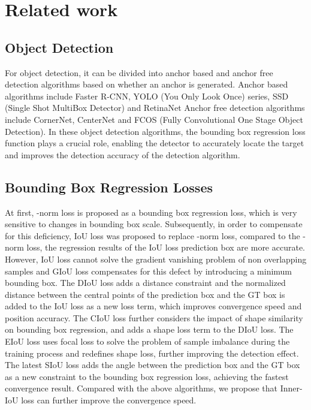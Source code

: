 \documentclass[lettersize,journal]{IEEEtran}
\begin{document}
	\section{Related work}
	\subsection{Object Detection}
	For object detection, it can be divided into anchor based and anchor free detection algorithms based on whether an anchor is generated. Anchor based algorithms include Faster R-CNN\cite{ref14}, YOLO (You Only Look Once) series\cite{ref10,ref11,ref12,ref13}, SSD (Single Shot MultiBox Detector)\cite{ref15} and RetinaNet\cite{ref16} Anchor free detection algorithms include CornerNet\cite{ref17}, CenterNet\cite{ref18} and FCOS (Fully Convolutional One Stage Object Detection)\cite{ref19}. In these object detection algorithms, the bounding box regression loss function plays a crucial role, enabling the detector to accurately locate the target and improves the detection accuracy of the detection algorithm.
	
	\subsection{Bounding Box Regression Losses}
	At first,  -norm loss\cite{ref14} is proposed as a bounding box regression loss, which is very sensitive to changes in bounding box scale. Subsequently, in order to compensate for this deficiency, IoU loss\cite{ref1} was proposed to replace -norm loss, compared to the -norm loss, the regression results of the IoU loss\cite{ref1} prediction box are more accurate. However, IoU loss cannot solve the gradient vanishing problem of non overlapping samples and GIoU loss\cite{ref2} compensates for this defect by introducing a minimum bounding box. The DIoU loss\cite{ref3} adds a distance constraint and the normalized distance between the central points of the prediction box and the GT box is added to the IoU loss as a new loss term, which improves convergence speed and position accuracy. The CIoU loss\cite{ref3} further considers the impact of shape similarity on bounding box regression, and adds a shape loss term to the DIoU loss. The EIoU loss\cite{ref4} uses focal loss to solve the problem of sample imbalance during the training process and redefines shape loss, further improving the detection effect. The latest SIoU\cite{ref5} loss adds the angle between the prediction box and the GT box as a new constraint to the bounding box regression loss, achieving the fastest convergence result. Compared with the above algorithms, we propose that Inner-IoU loss can further improve the convergence speed.
\end{document}
